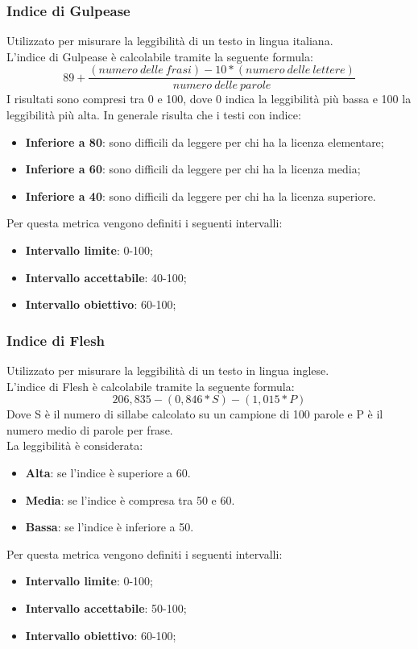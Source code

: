 \subsubsection{Indice di Gulpease}
Utilizzato per misurare la leggibilità di un testo in lingua italiana.\\
L'indice di Gulpease è calcolabile tramite la seguente formula:
$$
	89+\frac{(numero\:delle\:frasi)-10*(numero\:delle\:lettere)}{numero\:delle\:parole}
$$
I risultati sono compresi tra 0 e 100, dove 0 indica la leggibilità più bassa e 100 la leggibilità più alta. In generale risulta che i testi con indice:
	\begin{itemize}
		\item{\textbf{Inferiore	a 80}}: sono difficili da leggere per chi ha la licenza elementare;
		\item{\textbf{Inferiore	a 60}}: sono difficili da leggere per chi ha la licenza media;
		\item{\textbf{Inferiore	a 40}}: sono difficili da leggere per chi ha la licenza superiore.
	\end{itemize}
Per questa metrica vengono definiti i seguenti intervalli: 
	\begin{itemize}
		\item{\textbf{Intervallo limite}: 0-100;}
		\item{\textbf{Intervallo accettabile}: 40-100;}
		\item{\textbf{Intervallo obiettivo}: 60-100;}
	\end{itemize}
\subsubsection{Indice di Flesh}
Utilizzato per misurare la leggibilità di un testo in lingua inglese.\\
L'indice di Flesh è calcolabile tramite la seguente formula:
	$$
		206,835-(0,846*S)-(1,015*P)
	$$
Dove S è il numero di sillabe calcolato su un campione di 100 parole e P è il numero medio di parole per frase.\\
La leggibilità è considerata:
	\begin{itemize}
		\item{\textbf{Alta}}: se l'indice è superiore a 60.
		\item{\textbf{Media}}: se l'indice è compresa tra 50 e 60.
		\item{\textbf{Bassa}}: se l'indice è inferiore a 50.
	\end{itemize}
Per questa metrica vengono definiti i seguenti intervalli: 
\begin{itemize}
	\item{\textbf{Intervallo limite}: 0-100;}
	\item{\textbf{Intervallo accettabile}: 50-100;}
	\item{\textbf{Intervallo obiettivo}: 60-100;}
\end{itemize} 
